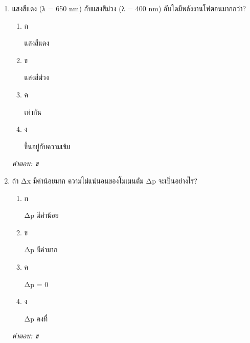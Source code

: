 \documentclass[12pt]{article}
\begin{document}
\begin{enumerate}[label=\arabic*., itemsep=0.5\baselineskip, topsep=0.5\baselineskip, leftmargin=*]
\item แสงสีแดง (λ = 650 nm) กับแสงสีม่วง (λ = 400 nm) อันใดมีพลังงานโฟตอนมากกว่า?
\begin{enumerate}[label=\alph*)., itemsep=0.3\baselineskip, topsep=0.3\baselineskip]
\item ก\ 
\begin{minipage}[t]{0.9\linewidth}
\raggedright แสงสีแดง
\end{minipage}
\item ข\ 
\begin{minipage}[t]{0.9\linewidth}
\raggedright แสงสีม่วง
\end{minipage}
\item ค\ 
\begin{minipage}[t]{0.9\linewidth}
\raggedright เท่ากัน
\end{minipage}
\item ง\ 
\begin{minipage}[t]{0.9\linewidth}
\raggedright ขึ้นอยู่กับความเข้ม
\end{minipage}
\end{enumerate}
\vspace{-0.3\baselineskip}
\begin{small}
\textit{คำตอบ: ข}
\end{small}

\item ถ้า Δx มีค่าน้อยมาก ความไม่แน่นอนของโมเมนตัม Δp จะเป็นอย่างไร?
\begin{enumerate}[label=\alph*)., itemsep=0.3\baselineskip, topsep=0.3\baselineskip]
\item ก\ 
\begin{minipage}[t]{0.9\linewidth}
\raggedright Δp มีค่าน้อย
\end{minipage}
\item ข\ 
\begin{minipage}[t]{0.9\linewidth}
\raggedright Δp มีค่ามาก
\end{minipage}
\item ค\ 
\begin{minipage}[t]{0.9\linewidth}
\raggedright Δp = 0
\end{minipage}
\item ง\ 
\begin{minipage}[t]{0.9\linewidth}
\raggedright Δp คงที่
\end{minipage}
\end{enumerate}
\vspace{-0.3\baselineskip}
\begin{small}
\textit{คำตอบ: ข}
\end{small}


\end{enumerate}
\end{document}
